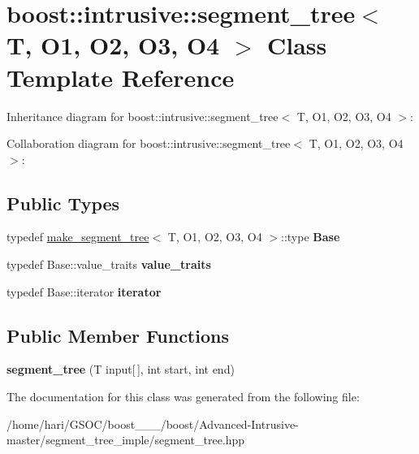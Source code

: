 \hypertarget{classboost_1_1intrusive_1_1segment__tree}{}\section{boost\+:\+:intrusive\+:\+:segment\+\_\+tree$<$ T, O1, O2, O3, O4 $>$ Class Template Reference}
\label{classboost_1_1intrusive_1_1segment__tree}


Inheritance diagram for boost\+:\+:intrusive\+:\+:segment\+\_\+tree$<$ T, O1, O2, O3, O4 $>$\+:


Collaboration diagram for boost\+:\+:intrusive\+:\+:segment\+\_\+tree$<$ T, O1, O2, O3, O4 $>$\+:
\subsection*{Public Types}
\begin{DoxyCompactItemize}
\item 
\mbox{\label{classboost_1_1intrusive_1_1segment__tree_a56984f6fac5fb61618c53ca07704cf45}} 
typedef \hyperlink{structboost_1_1intrusive_1_1make__segment__tree}{make\+\_\+segment\+\_\+tree}$<$ T, O1, O2, O3, O4 $>$\+::type {\bfseries Base}
\item 
\mbox{\label{classboost_1_1intrusive_1_1segment__tree_aaff3016f655ec2b1dfe44282913cefea}} 
typedef Base\+::value\+\_\+traits {\bfseries value\+\_\+traits}
\item 
\mbox{\label{classboost_1_1intrusive_1_1segment__tree_a20e4825aed9b33d2de0b7f4177bacd7b}} 
typedef Base\+::iterator {\bfseries iterator}
\end{DoxyCompactItemize}
\subsection*{Public Member Functions}
\begin{DoxyCompactItemize}
\item 
\mbox{\label{classboost_1_1intrusive_1_1segment__tree_a30f63674d219804557316b5c58154d5c}} 
{\bfseries segment\+\_\+tree} (T input\mbox{[}$\,$\mbox{]}, int start, int end)
\end{DoxyCompactItemize}


The documentation for this class was generated from the following file\+:\begin{DoxyCompactItemize}
\item 
/home/hari/\+G\+S\+O\+C/boost\+\_\+\_\+\_/boost/\+Advanced-\/\+Intrusive-\/master/segment\+\_\+tree\+\_\+imple/segment\+\_\+tree.\+hpp\end{DoxyCompactItemize}
